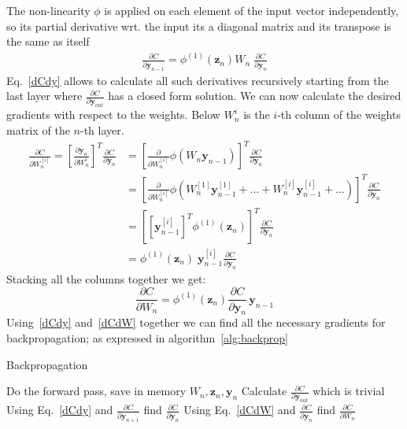 \documentclass[11pt]{report}
\begin{document}
    The non-linearity $\phi$ is applied on each element of the input vector independently, so its partial derivative wrt.
    the input its a diagonal matrix and its transpose is the same as itself
    \begin{align}
        \frac{ \partial C}{\partial \textbf{y}_{n-1} }
        =
        \phi^{(1)}( \pmb{z}_n )
        W_n \;
        \frac{ \partial C}{\partial \textbf{y}_{n} }
        \label{dCdy}
    \end{align}
    Eq.~\eqref{dCdy} allows to calculate all such derivatives recursively starting from the last layer where $\frac{\partial C}{\partial \textbf{y}_{out}}$ has a closed form solution.
    We can now calculate the desired gradients with respect to the weights.
    Below $W_n^i$ is the $i$-th column of the weights matrix of the $n$-th layer.
    \begin{align*}
        \frac{ \partial C}{\partial W_n^{[i]} }
        =
        \left[ \frac{ \partial \pmb{y}_{n}}{\partial W_n^i } \right]^T
        \frac{ \partial C}{\partial \pmb{y}_{n} }
        &=
        \left[ \frac{ \partial }{\partial W_n^{[i]} }  \phi( W_{n} \bm{y}_{n-1} )  \right]^T
        \frac{ \partial C}{\partial \pmb{y}_{n} }
        \\
        &=
        \left[ \frac{ \partial }{\partial W_n^{[i]} }  \phi(  W_{n}^{[1]} \bm{y}_{n-1}^{[1]} + \dots +W_{n}^{[i]} \bm{y}_{n-1}^{[i]} + \dots )  \right]^T
        \frac{ \partial C}{\partial \pmb{y}_{n} }
        \\
        &=
        \left[ \left[ \pmb{y}_{n-1}^{[i]} \right]^T \phi^{(1)}(\pmb{z}_n )  \right]^T
        \frac{ \partial C}{\partial \pmb{y}_{n} }
        \\
        &=
        \phi^{(1)}(\pmb{z}_n ) \; \pmb{y}_{n-1}^{[i]}
        \frac{ \partial C}{\partial \pmb{y}_{n} }
    \end{align*}
    Stacking all the columns together we get:
    \begin{equation}
        \label{dCdW}
        \frac{ \partial C}{\partial W_n}
        =
        \phi^{(1)}(\pmb{z}_n )
        \frac{ \partial C}{\partial \pmb{y}_{n} }  \,
        \pmb{y}_{n-1}
    \end{equation}
    Using~\eqref{dCdy} and~\eqref{dCdW} together we can find all the necessary gradients for backpropagation; as expressed in algorithm~\ref{alg:backprop}
    \begin{algorithm}
        \caption{Backpropagation}
        \label{alg:backprop}
        \begin{algorithmic}
            \State Do the forward pass, save in memory $W_n, \textbf{z}_n, \textbf{y}_n$
            \State Calculate $\frac{\partial C}{\partial \textbf{y}_{out}}$ which is trivial
                \State Using Eq.~\eqref{dCdy} and  $\frac{\partial C}{\partial \textbf{y}_{n+1}} $ find $\frac{\partial C}{\partial \textbf{y}_n}$
                \State  Using Eq.~\eqref{dCdW} and $\frac{\partial C}{\partial \textbf{y}_n}$ find $\frac{\partial C}{\partial W_n}$
            \EndFor
        \end{algorithmic}
    \end{algorithm}
\end{document}
